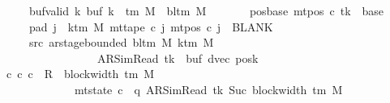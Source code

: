 \begin{isabellebody}
\ \ \ \ \ \ \ buf{}{\isacharunderscore}{\kern0pt}valid{\isacharcolon}{\kern0pt}\ {\isachardoublequoteopen}{\isasymforall}k{\isachardot}{\kern0pt}\ buf{}\ k\ {\isasymin}\ {\isasymGamma}{\isacharunderscore}{\kern0pt}tm\ M\ {\isasymunion}\ {\isacharbraceleft}{\kern0pt}bl{\isacharunderscore}{\kern0pt}tm\ M{\isacharbraceright}{\kern0pt}{\isachardoublequoteclose}\isanewline
\ \ \ \ \ \ \ pos{\isacharunderscore}{\kern0pt}base{\isacharcolon}{\kern0pt}\ {\isachardoublequoteopen}mt{\isacharunderscore}{\kern0pt}pos\ c{\isacharprime}{\kern0pt}\ tk\ {\isacharequal}{\kern0pt}\ base{\isachardoublequoteclose}\isanewline
\ \ \ \ \ \ \ pad{}{\isacharcolon}{\kern0pt}\ {\isachardoublequoteopen}{\isasymforall}j\ {\isasymge}\ k{\isacharunderscore}{\kern0pt}tm\ M{\isachardot}{\kern0pt}\ mt{\isacharunderscore}{\kern0pt}tape\ c{\isacharprime}{\kern0pt}\ j\ {\isacharparenleft}{\kern0pt}mt{\isacharunderscore}{\kern0pt}pos\ c{\isacharprime}{\kern0pt}\ j{\isacharparenright}{\kern0pt}\ {\isacharequal}{\kern0pt}\ BLANK{}{\isachardoublequoteclose}\isanewline
\ \ \ \ \ \ \ src{}{\isacharcolon}{\kern0pt}\ {\isachardoublequoteopen}ar{\isacharunderscore}{\kern0pt}stage{\isacharunderscore}{\kern0pt}bounded\ {\isacharparenleft}{\kern0pt}bl{\isacharunderscore}{\kern0pt}tm\ M{\isacharparenright}{\kern0pt}\ {\isacharparenleft}{\kern0pt}k{\isacharunderscore}{\kern0pt}tm\ M{\isacharparenright}{\kern0pt}\isanewline
\ \ \ \ \ \ \ \ \ \ \ \ \ \ \ \ \ \ \ {\isacharparenleft}{\kern0pt}AR{\isacharunderscore}{\kern0pt}SimRead{\isacharcomma}{\kern0pt}\ tk{\isacharcomma}{\kern0pt}\ {}{\isacharcomma}{\kern0pt}\ buf{}{\isacharcomma}{\kern0pt}\ dvec{\isacharcomma}{\kern0pt}\ posk{\isacharparenright}{\kern0pt}{\isachardoublequoteclose}\isanewline
\ \ \ {\isachardoublequoteopen}{\isasymexists}c{\isacharprime}{\kern0pt}{\isacharprime}{\kern0pt}{\isachardot}{\kern0pt}\ {\isacharparenleft}{\kern0pt}c{\isacharprime}{\kern0pt}{\isacharcomma}{\kern0pt}\ c{\isacharprime}{\kern0pt}{\isacharprime}{\kern0pt}{\isacharparenright}{\kern0pt}\ {\isasymin}\ R{\isacharprime}{\kern0pt}\ {\isacharcircum}{\kern0pt}{\isacharcircum}{\kern0pt}\ {\isacharparenleft}{\kern0pt}block{\isacharunderscore}{\kern0pt}width\ {\isacharparenleft}{\kern0pt}{\isasymGamma}{\isacharunderscore}{\kern0pt}tm\ M{\isacharparenright}{\kern0pt}\ {\isacharminus}{\kern0pt}\ {}{\isacharparenright}{\kern0pt}\isanewline
\ \ \ \ \ \ \ \ \ \ \ \ \ \ {\isasymand}\ mt{\isacharunderscore}{\kern0pt}state\ c{\isacharprime}{\kern0pt}{\isacharprime}{\kern0pt}\ {\isacharequal}{\kern0pt}\ {\isacharparenleft}{\kern0pt}q{\isacharcomma}{\kern0pt}\ AR{\isacharunderscore}{\kern0pt}SimRead{\isacharcomma}{\kern0pt}\ tk{\isacharcomma}{\kern0pt}\ Suc\ {\isacharparenleft}{\kern0pt}block{\isacharunderscore}{\kern0pt}width\ {\isacharparenleft}{\kern0pt}{\isasymGamma}{\isacharunderscore}{\kern0pt}tm\ M{\isacharparenright}{\kern0pt}{\isacharparenright}{\kern0pt}{\isacharcomma}{\kern0pt}\isanewline

\end{isabellebody}
